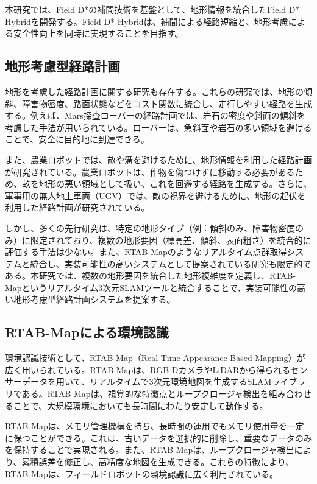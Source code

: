本研究では、Field D*の補間技術を基盤として、地形情報を統合したField D* Hybridを開発する。Field D* Hybridは、補間による経路短縮と、地形考慮による安全性向上を同時に実現することを目指す。

\subsection{地形考慮型経路計画}

地形を考慮した経路計画に関する研究も存在する。これらの研究では、地形の傾斜、障害物密度、路面状態などをコスト関数に統合し、走行しやすい経路を生成する。例えば、Mars探査ローバーの経路計画では、岩石の密度や斜面の傾斜を考慮した手法が用いられている。ローバーは、急斜面や岩石の多い領域を避けることで、安全に目的地に到達できる。

また、農業ロボットでは、畝や溝を避けるために、地形情報を利用した経路計画が研究されている。農業ロボットは、作物を傷つけずに移動する必要があるため、畝を地形の悪い領域として扱い、これを回避する経路を生成する。さらに、軍事用の無人地上車両（UGV）では、敵の視界を避けるために、地形の起伏を利用した経路計画が研究されている。

しかし、多くの先行研究は、特定の地形タイプ（例：傾斜のみ、障害物密度のみ）に限定されており、複数の地形要因（標高差、傾斜、表面粗さ）を統合的に評価する手法は少ない。また、RTAB-Mapのようなリアルタイム点群取得システムと統合し、実装可能性の高いシステムとして提案されている研究も限定的である。本研究では、複数の地形要因を統合した地形複雑度を定義し、RTAB-Mapというリアルタイム3次元SLAMツールと統合することで、実装可能性の高い地形考慮型経路計画システムを提案する。

\subsection{RTAB-Mapによる環境認識}

環境認識技術として、RTAB-Map（Real-Time Appearance-Based Mapping）が広く用いられている。RTAB-Mapは、RGB-DカメラやLiDARから得られるセンサーデータを用いて、リアルタイムで3次元環境地図を生成するSLAMライブラリである。RTAB-Mapは、視覚的な特徴点とループクロージャ検出を組み合わせることで、大規模環境においても長時間にわたり安定して動作する。

RTAB-Mapは、メモリ管理機構を持ち、長時間の運用でもメモリ使用量を一定に保つことができる。これは、古いデータを選択的に削除し、重要なデータのみを保持することで実現される。また、RTAB-Mapは、ループクロージャ検出により、累積誤差を修正し、高精度な地図を生成できる。これらの特徴により、RTAB-Mapは、フィールドロボットの環境認識に広く利用されている。


